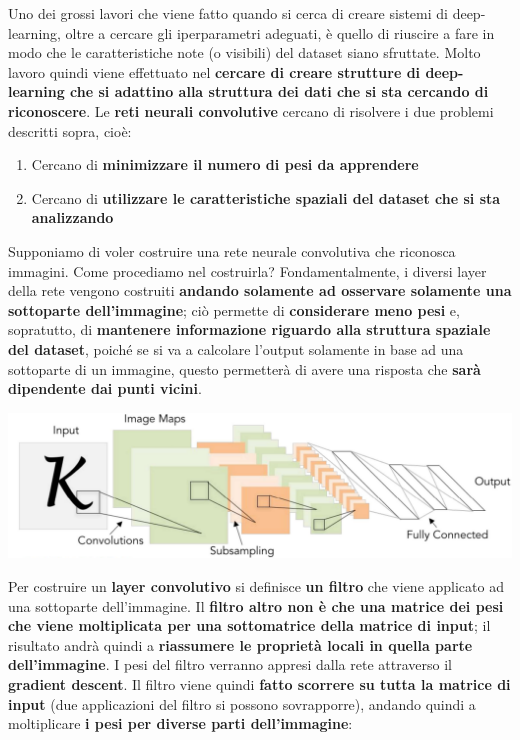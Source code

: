 \documentclass[12pt]{article}
\begin{document}
Uno dei grossi lavori che viene fatto quando si cerca di creare sistemi di deep-learning, oltre a cercare gli iperparametri adeguati, è quello di riuscire a fare in modo che le caratteristiche note (o visibili) del dataset siano sfruttate.
Molto lavoro quindi viene effettuato nel \textbf{cercare di creare strutture di deep-learning che si adattino alla struttura dei dati che si sta cercando di riconoscere}.
Le \textbf{reti neurali convolutive} cercano di risolvere i due problemi descritti sopra, cioè:
\begin{enumerate}
    \item Cercano di \textbf{minimizzare il numero di pesi da apprendere}
    \item Cercano di \textbf{utilizzare le caratteristiche spaziali del dataset che si sta analizzando}
\end{enumerate}
Supponiamo di voler costruire una rete neurale convolutiva che riconosca immagini. Come procediamo nel costruirla?
Fondamentalmente, i diversi layer della rete vengono costruiti \textbf{andando solamente ad osservare solamente una sottoparte dell'immagine}; ciò permette di \textbf{considerare meno pesi} e, sopratutto, di \textbf{mantenere informazione riguardo alla struttura spaziale del dataset}, poiché se si va a calcolare
l'output solamente in base ad una sottoparte di un immagine, questo permetterà di avere una risposta che \textbf{sarà dipendente dai punti vicini}.
\begin{center}
    \includegraphics[width =0.90\linewidth]{Images/145.PNG}
\end{center}
Per costruire un \textbf{layer convolutivo} si definisce \textbf{un filtro} che viene applicato ad una sottoparte dell'immagine.
Il \textbf{filtro altro non è che una matrice dei pesi che viene moltiplicata per una sottomatrice della matrice di input}; il risultato andrà quindi a \textbf{riassumere le proprietà locali in quella parte dell'immagine}. I pesi del filtro verranno appresi dalla rete attraverso il \textbf{gradient descent}.
Il filtro viene quindi \textbf{fatto scorrere su tutta la matrice di input} (due applicazioni del filtro si possono sovrapporre), andando quindi a moltiplicare \textbf{i pesi per diverse parti dell'immagine}:
\end{document}
